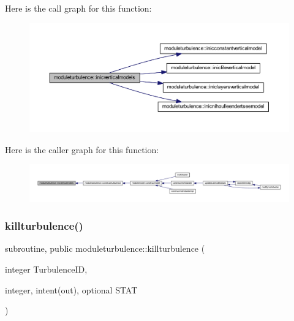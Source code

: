 Here is the call graph for this function\+:\nopagebreak
\begin{figure}[H]
\begin{center}
\leavevmode
\includegraphics[width=350pt]{namespacemoduleturbulence_a676ecd9b2dc8e4fd2506801b206e0fdc_cgraph}
\end{center}
\end{figure}
Here is the caller graph for this function\+:\nopagebreak
\begin{figure}[H]
\begin{center}
\leavevmode
\includegraphics[width=350pt]{namespacemoduleturbulence_a676ecd9b2dc8e4fd2506801b206e0fdc_icgraph}
\end{center}
\end{figure}
\mbox{\label{namespacemoduleturbulence_a16fdef89832180a7e41d6bd450c05746}} 
\subsubsection{\texorpdfstring{killturbulence()}{killturbulence()}}
{\footnotesize\ttfamily subroutine, public moduleturbulence\+::killturbulence (\begin{DoxyParamCaption}\item[{integer}]{Turbulence\+ID,  }\item[{integer, intent(out), optional}]{S\+T\+AT }\end{DoxyParamCaption})}

